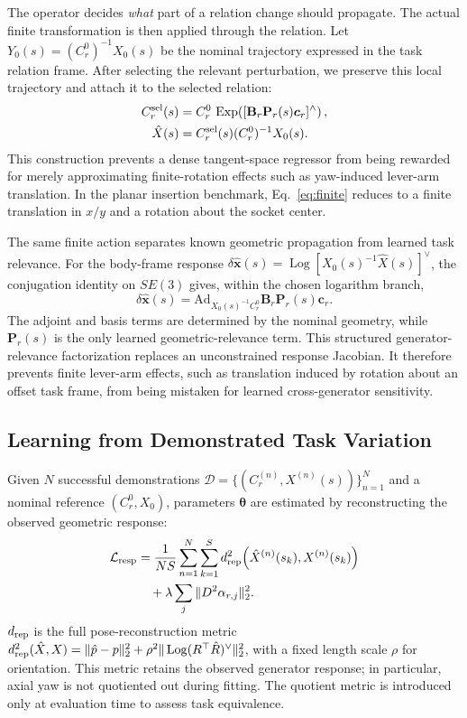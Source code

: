 \documentclass[letterpaper,10pt,conference]{ieeeconf}
\DeclareMathOperator{\Log}{Log}
\DeclareMathOperator{\Exp}{Exp}
\begin{document}
The operator decides \emph{what} part of a relation change should propagate.
The actual finite transformation is then applied through the relation. Let
$Y_0(s)=(C_r^0)^{-1}X_0(s)$ be the nominal trajectory expressed in the task
relation frame. After selecting the relevant perturbation, we preserve this
local trajectory and attach it to the selected relation:
\begin{align}
    C_r^{\rm sel}(s)
    &=
    C_r^0\,
    \Exp\!\left(
    [\mathbf B_r\mathbf P_r(s)\bm c_r]^\wedge
    \right),\\
    \hat X(s)
    &=
    C_r^{\rm sel}(s)(C_r^0)^{-1}X_0(s).
    \label{eq:finite}
\end{align}
This construction prevents a dense tangent-space regressor from being rewarded
for merely approximating finite-rotation effects such as yaw-induced lever-arm
translation. In the planar insertion benchmark, Eq.~\eqref{eq:finite} reduces
to a finite translation in $x/y$ and a rotation about the socket center.

The same finite action separates known geometric propagation from learned task
relevance. For the body-frame response
$\delta\hat{\bm x}(s)=\Log[X_0(s)^{-1}\hat X(s)]^\vee$, the conjugation identity
on $SE(3)$ gives, within the chosen logarithm branch,
\begin{equation}
    \boxed{
    \delta\hat{\bm x}(s)=
    \mathrm{Ad}_{X_0(s)^{-1}C_r^0}\mathbf B_r\mathbf P_r(s)\bm c_r .
    }
    \label{eq:central_decomposition}
\end{equation}
The adjoint and basis terms are determined by the nominal geometry, while
$\mathbf P_r(s)$ is the only learned geometric-relevance term. This structured
generator-relevance factorization replaces an unconstrained response Jacobian.
It therefore prevents finite lever-arm effects, such as translation induced by
rotation about an offset task frame, from being mistaken for learned
cross-generator sensitivity.

\subsection{Learning from Demonstrated Task Variation}

Given $N$ successful demonstrations
$\mathcal D=\{(C_r^{(n)},X^{(n)}(s))\}_{n=1}^{N}$ and a nominal reference
$(C_r^0,X_0)$, parameters $\bm\theta$ are estimated by reconstructing the
observed geometric response:
\begin{align}
\mathcal L_{\rm resp}
&=
\frac{1}{NS}\sum_{n=1}^{N}\sum_{k=1}^{S}
d_{\rm rep}^{2}\!\left(\hat X^{(n)}(s_k),X^{(n)}(s_k)\right) \nonumber\\
&\quad+\lambda\sum_j\|D^2\alpha_{r,j}\|_2^2 .
\label{eq:loss}
\end{align}
$d_{\rm rep}$ is the full pose-reconstruction metric
$d_{\rm rep}^2(\hat X,X)=\|\hat p-p\|_2^2+
\rho^2\|\Log(R^\top\hat R)^\vee\|_2^2$, with a fixed length scale $\rho$ for
orientation. This metric retains the observed generator response; in particular,
axial yaw is not quotiented out during fitting. The quotient metric is
introduced only at evaluation time to assess task equivalence.
\end{document}
